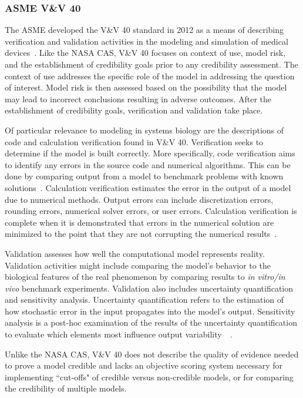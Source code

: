 \documentclass[12pt]{report}
\begin{document}
\subsubsection{ASME V\&V 40}

The ASME developed the V\&V 40 standard in 2012 as a means of describing verification and validation activities in the modeling and simulation of medical devices~\cite{viceconti_credibility_2020}. Like the NASA CAS, V\&V 40 focuses on context of use, model risk, and the establishment of credibility goals prior to any credibility assessment. The context of use addresses the specific role of the model in addressing the question of interest. Model risk is then assessed based on the possibility that the model may lead to incorrect conclusions resulting in adverse outcomes. After the establishment of credibility goals, verification and validation take place. 

Of particular relevance to modeling in systems biology are the descriptions of code and calculation verification found in V\&V 40. Verification seeks to determine if the model is built correctly. More specifically, code verification aims to identify any errors in the source code and numerical algorithms. This can be done by comparing output from a model to benchmark problems with known solutions~\cite{viceconti_credibility_2020}. Calculation verification estimates the error in the output of a model due to numerical methods. Output errors can include discretization errors, rounding errors, numerical solver errors, or user errors. Calculation verification is complete when it is demonstrated that errors in the numerical solution are minimized to the point that they are not corrupting the numerical results~\cite{viceconti_credibility_2020}.

Validation assesses how well the computational model represents reality. Validation activities might include comparing the model's behavior to the biological features of the real phenomenon by comparing results to \textit{in vitro/in vivo} benchmark experiments. Validation also includes uncertainty quantification and sensitivity analysis. Uncertainty quantification refers to the estimation of how stochastic error in the input propagates into the model's output. Sensitivity analysis is a post-hoc examination of the results of the uncertainty quantification to evaluate which elements most influence output variability~~\cite{viceconti_credibility_2020}.

Unlike the NASA CAS, V\&V 40 does not describe the quality of evidence needed to prove a model credible and lacks an objective scoring system necessary for implementing ``cut-offs" of credible versus non-credible models, or for comparing the credibility of multiple models.
\end{document}
